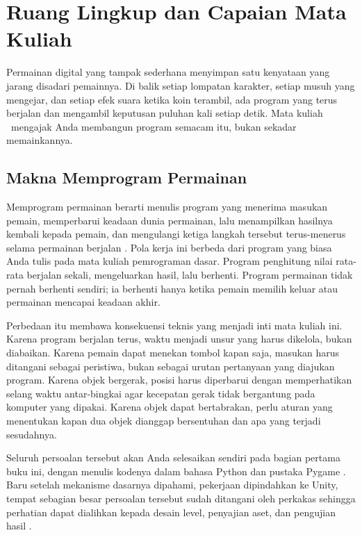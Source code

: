 \section{Ruang Lingkup dan Capaian Mata Kuliah}
\label{sec:ruang-lingkup}

Permainan digital yang tampak sederhana menyimpan satu kenyataan yang jarang
disadari pemainnya. Di balik setiap lompatan karakter, setiap musuh yang
mengejar, dan setiap efek suara ketika koin terambil, ada program yang terus
berjalan dan mengambil keputusan puluhan kali setiap detik. Mata kuliah
\NamaMK\ mengajak Anda membangun program semacam itu, bukan sekadar
memainkannya.

\subsection{Makna Memprogram Permainan}

Memprogram permainan berarti menulis program yang menerima masukan pemain,
memperbarui keadaan dunia permainan, lalu menampilkan hasilnya kembali kepada
pemain, dan mengulangi ketiga langkah tersebut terus-menerus selama permainan
berjalan \cite{nystrom-gameloop}. Pola kerja ini berbeda dari program yang
biasa Anda tulis pada mata kuliah pemrograman dasar. Program penghitung nilai
rata-rata berjalan sekali, mengeluarkan hasil, lalu berhenti. Program
permainan tidak pernah berhenti sendiri; ia berhenti hanya ketika pemain
memilih keluar atau permainan mencapai keadaan akhir.

Perbedaan itu membawa konsekuensi teknis yang menjadi inti mata kuliah ini.
Karena program berjalan terus, waktu menjadi unsur yang harus dikelola, bukan
diabaikan. Karena pemain dapat menekan tombol kapan saja, masukan harus
ditangani sebagai peristiwa, bukan sebagai urutan pertanyaan yang diajukan
program. Karena objek bergerak, posisi harus diperbarui dengan memperhatikan
selang waktu antar-bingkai agar kecepatan gerak tidak bergantung pada
komputer yang dipakai. Karena objek dapat bertabrakan, perlu aturan yang
menentukan kapan dua objek dianggap bersentuhan dan apa yang terjadi
sesudahnya.

Seluruh persoalan tersebut akan Anda selesaikan sendiri pada bagian pertama
buku ini, dengan menulis kodenya dalam bahasa Python dan pustaka Pygame
\cite{sweigart-mg}. Baru setelah mekanisme dasarnya dipahami, pekerjaan
dipindahkan ke  Unity, tempat sebagian besar persoalan
tersebut sudah ditangani oleh perkakas sehingga perhatian dapat dialihkan
kepada desain level, penyajian aset, dan pengujian hasil \cite{unity-leveldesign}.

